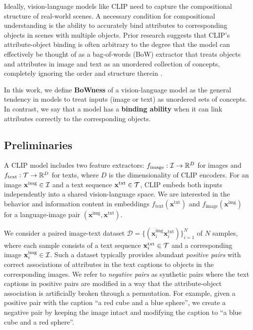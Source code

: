 Ideally, vision-language models like CLIP need to capture the compositional structure of real-world scenes. A necessary condition for compositional understanding is the ability to accurately bind attributes to corresponding objects in scenes with multiple objects. Prior research suggests that CLIP's attribute-object binding is often arbitrary to the degree that the model can effectively be thought of as a bag-of-words (BoW) extractor that treats objects and attributes in image and text as an unordered collection of concepts, completely ignoring the order and structure therein \cite{Yuksekgonul2023}. 



In this work, we define \textbf{BoWness} of a vision-language model as the general tendency in models to treat inputs (image or text) as unordered sets of concepts. In contrast, we say that a model has a \textbf{binding ability} when it can link attributes correctly to the corresponding objects.



\subsection{Preliminaries} 

A CLIP model includes two feature extractors: $f_{\text{image}} : \mathcal{I} \rightarrow \mathbb{R}^D$ for images and $f_{\text{text}} : \mathcal{T} \rightarrow \mathbb{R}^D$ for texts, where $D$ is the dimensionality of CLIP encoders. For an image $\mathbf{x}^{\text{img}} \in \mathcal{I}$ and a text sequence $\mathbf{x}^{\text{txt}} \in \mathcal{T}$, CLIP embeds both inputs independently into a shared vision-language space. We are interested in the behavior and information content in embeddings $f_{\text{text}}(\mathbf{x}^{\text{txt}} )$ and $f_{\text{image}}(\mathbf{x}^{\text{img}})$ for a language-image pair $(\mathbf{x}^{\text{img}} , \mathbf{x}^{\text{txt}} )$.

We consider a paired image-text dataset $\mathcal{D} = \{(\mathbf{x}_{i}^{\text{img}} \mathbf{x}_{i}^{\text{txt}} )\}_{i=1}^N$ of $N$ samples, where each sample consists of a text sequence $\mathbf{x}_{i}^{\text{txt}} \in \mathcal{T}$ and a corresponding image $\mathbf{x}_{i}^{\text{img}} \in \mathcal{I}$. Such a dataset typically provides abundant \textit{positive pairs} with correct associations of attributes in the text captions to objects in the corresponding images. We refer to \textit{negative pairs} as synthetic pairs where the text captions in positive pairs are modified in a way that the attribute-object association is artificially broken through a permutation. For example, given a positive pair with the caption ``a red cube and a blue sphere'', we create a negative pair by keeping the image intact and modifying the caption to ``a blue cube and a red sphere''. %




